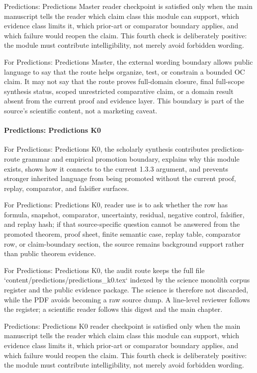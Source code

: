 Predictions: Predictions Master reader checkpoint is satisfied only when the main manuscript tells the reader which claim class this module can support, which evidence class limits it, which prior-art or comparator boundary applies, and which failure would reopen the claim. This fourth check is deliberately positive: the module must contribute intelligibility, not merely avoid forbidden wording.


For Predictions: Predictions Master, the external wording boundary allows public language to say that the route helps organize, test, or constrain a bounded OC claim. It may not say that the route proves full-domain closure, final full-scope synthesis status, scoped unrestricted comparative claim, or a domain result absent from the current proof and evidence layer. This boundary is part of the source's scientific content, not a marketing caveat.


\paragraph{Predictions: Predictions K0}

For Predictions: Predictions K0, the scholarly synthesis contributes prediction-route grammar and empirical promotion boundary, explains why this module exists, shows how it connects to the current 1.3.3 argument, and prevents stronger inherited language from being promoted without the current proof, replay, comparator, and falsifier surfaces.


For Predictions: Predictions K0, reader use is to ask whether the row has formula, snapshot, comparator, uncertainty, residual, negative control, falsifier, and replay hash; if that source-specific question cannot be answered from the promoted theorem, proof sheet, finite semantic case, replay table, comparator row, or claim-boundary section, the source remains background support rather than public theorem evidence.


For Predictions: Predictions K0, the audit route keeps the full file `content/predictions/predictions\_k0.tex` indexed by the science monolith corpus register and the public evidence package. The science is therefore not discarded, while the PDF avoids becoming a raw source dump. A line-level reviewer follows the register; a scientific reader follows this digest and the main chapter.


Predictions: Predictions K0 reader checkpoint is satisfied only when the main manuscript tells the reader which claim class this module can support, which evidence class limits it, which prior-art or comparator boundary applies, and which failure would reopen the claim. This fourth check is deliberately positive: the module must contribute intelligibility, not merely avoid forbidden wording.



